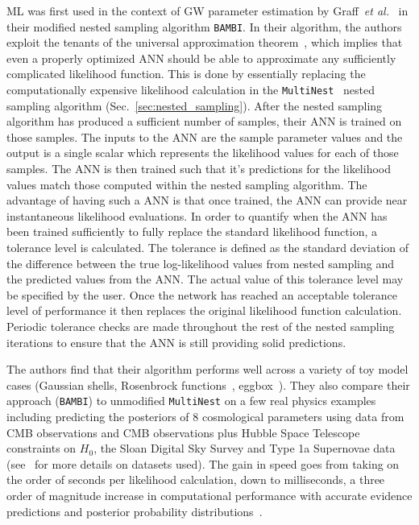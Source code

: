%
\ac{ML} was first used in the context of \ac{GW} parameter 
estimation by Graff~\textit{et al.}~\cite{10.1111/j.1365-2966.2011.20288.x}
in their modified nested sampling algorithm \texttt{BAMBI}. 
In their algorithm, the authors exploit the tenants of the 
universal approximation theorem~\cite{HORNIK1990551}, which implies 
that even a properly optimized \ac{ANN} should be able to 
approximate any sufficiently complicated likelihood function. 
This is done by essentially replacing the computationally 
expensive likelihood calculation 
in the \texttt{MultiNest}~\cite{2009MNRAS.398.1601F} nested 
sampling algorithm (Sec.~\ref{sec:nested_sampling}). After the 
nested sampling algorithm has produced a sufficient number of 
samples, their \ac{ANN} is trained on those samples. The inputs 
to the \ac{ANN} are the sample parameter values 
and the output is a single scalar which represents the likelihood 
values for each of those samples. The \ac{ANN} is then trained 
such that it's predictions for the likelihood values match 
those computed within the nested sampling algorithm. The advantage 
of having such a \ac{ANN} is that once trained, the \ac{ANN} can 
provide near instantaneous likelihood evaluations. In order to 
quantify when the \ac{ANN} has been trained sufficiently to 
fully replace the standard likelihood function, a tolerance level 
is calculated. The tolerance is defined as the standard 
deviation of the difference between the true log-likelihood 
values from nested sampling and the predicted values from the 
\ac{ANN}. The actual value of this tolerance level may 
be specified by the user. Once the network has 
reached an acceptable tolerance level of performance it 
then replaces the original likelihood function calculation. 
Periodic tolerance checks are made throughout the rest of the 
nested sampling iterations to ensure that the \ac{ANN} is still 
providing solid predictions.

The authors find that their algorithm performs well across a variety 
of toy model cases (Gaussian shells, Rosenbrock
functions~\cite{Shang2006ANO}, 
eggbox~\cite{2009MNRAS.398.1601F}). They also compare their 
approach (\texttt{BAMBI}) to unmodified \texttt{MultiNest} on a 
few real physics examples including predicting the posteriors of 
8 cosmological parameters using data from \ac{CMB} observations 
and \ac{CMB} observations plus Hubble Space Telescope constraints 
on $H_0$, the Sloan Digital Sky Survey and Type 1a Supernovae data 
(see~\cite{10.1111/j.1365-2966.2011.20288.x} for more details 
on datasets used). 
The gain in speed goes from taking on the order of seconds per 
likelihood calculation, down to milliseconds, a three order of 
magnitude increase in computational performance with 
accurate evidence predictions and posterior 
probability distributions~\cite{10.1111/j.1365-2966.2011.20288.x}.

